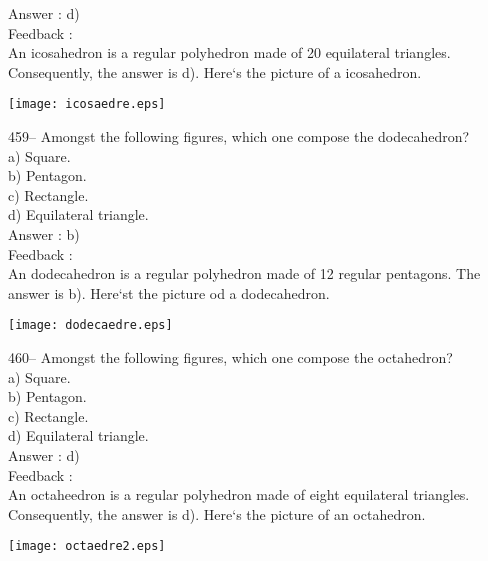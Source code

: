 \documentclass[letterpaper, 12pt]{article}
\begin{document}
Answer : d)\\

Feedback : \\
An icosahedron  is a regular polyhedron made of 20 equilateral triangles.  Consequently, the answer is d).  
Here`s the picture of a icosahedron.\\
    \begin{center}
    \texttt{[image: icosaedre.eps]}
    \end{center}


459-- Amongst the following figures, which one compose the dodecahedron?\\
a) Square.\\
b) Pentagon.\\
c) Rectangle.\\
d) Equilateral triangle.\\

Answer : b)\\

Feedback : \\
An dodecahedron is a regular polyhedron made of 12 regular pentagons.  The answer is b).  Here`st the picture od a dodecahedron.\\
    \begin{center}
    \texttt{[image: dodecaedre.eps]}
    \end{center}


460-- Amongst the following figures, which one compose the octahedron?\\
a) Square.\\
b) Pentagon.\\
c) Rectangle.\\
d) Equilateral triangle.\\

Answer : d)\\

Feedback : \\
An octaheedron is a regular polyhedron made of eight equilateral triangles.  Consequently, the answer is d).  Here`s the picture of an octahedron.\\
    \begin{center}
    \texttt{[image: octaedre2.eps]}
    \end{center}
\end{document}
